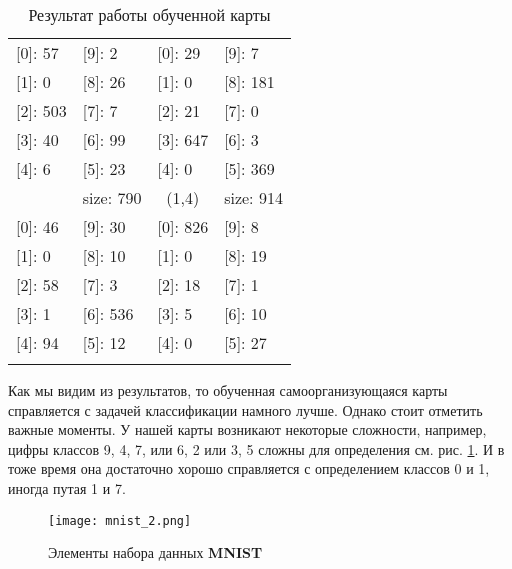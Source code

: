 \documentclass[a4paper,12pt]{report}
\begin{document}
\begin{longtable}[c]{llll}
{[}0{]}: 57 & {[}9{]}: 2 & {[}0{]}: 29 & {[}9{]}: 7 \\
{[}1{]}: 0 & {[}8{]}: 26 & {[}1{]}: 0 & {[}8{]}: 181 \\
{[}2{]}: 503 & {[}7{]}: 7 & {[}2{]}: 21 & {[}7{]}: 0 \\
{[}3{]}: 40 & {[}6{]}: 99 & {[}3{]}: 647 & {[}6{]}: 3 \\
{[}4{]}: 6 & {[}5{]}: 23 & {[}4{]}: 0 & {[}5{]}: 369 \\
\rowcolor[HTML]{D9D9D9} 
\multicolumn{1}{c}{\cellcolor[HTML]{D9D9D9}(0,4)} & \multicolumn{1}{c}{\cellcolor[HTML]{D9D9D9}size: 790} & \multicolumn{1}{c}{\cellcolor[HTML]{D9D9D9}(1,4)} & \multicolumn{1}{c}{\cellcolor[HTML]{D9D9D9}size: 914} \\
{[}0{]}: 46 & {[}9{]}: 30 & {[}0{]}: 826 & {[}9{]}: 8 \\
{[}1{]}: 0 & {[}8{]}: 10 & {[}1{]}: 0 & {[}8{]}: 19 \\
{[}2{]}: 58 & {[}7{]}: 3 & {[}2{]}: 18 & {[}7{]}: 1 \\
{[}3{]}: 1 & {[}6{]}: 536 & {[}3{]}: 5 & {[}6{]}: 10 \\
{[}4{]}: 94 & {[}5{]}: 12 & {[}4{]}: 0 & {[}5{]}: 27 \\
\caption{Результат работы обученной карты}
\label{tab:res_educ}\\
\end{longtable}

Как мы видим из результатов, то обученная самоорганизующаяся карты
справляется с задачей классификации намного лучше. Однако стоит
отметить важные моменты. У нашей карты возникают некоторые сложности,
например, цифры классов 9, 4, 7, или 6, 2 или 3, 5 сложны для определения см.
рис. \ref{fig:mnist_2}. И в тоже время она достаточно хорошо
справляется с определением классов 0 и 1, иногда путая 1 и 7.


\begin{figure}[!htb]
    \centering
    \captionsetup{justification=centering}
    \texttt{[image: mnist\_2.png]}
    \caption{Элементы набора данных \textbf{MNIST}}
    \label{fig:mnist_2}
\end{figure}
\end{document}
